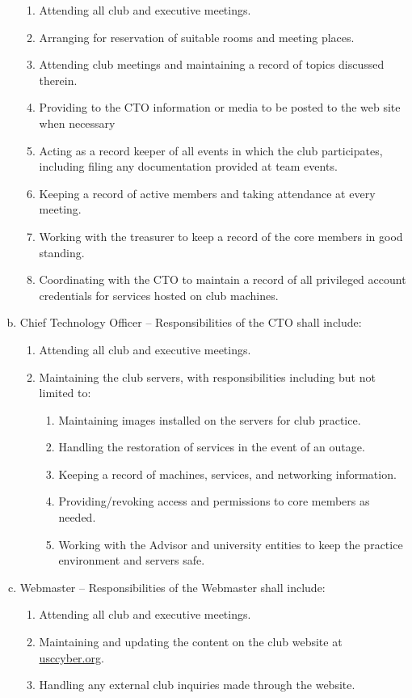 \documentclass[10pt]{article}
\begin{document}
\begin{enumerate}[(a)]
    \begin{enumerate}[1.]
        \item Attending all club and executive meetings.
        \item Arranging for reservation of suitable rooms and meeting places.
        \item Attending club meetings and maintaining a record of topics discussed therein.
        \item Providing to the CTO information or media to be posted to the web site when necessary
        \item Acting as a record keeper of all events in which the club participates, including filing any documentation provided at team events.
        \item Keeping a record of active members and taking attendance at every meeting.
        \item Working with the treasurer to keep a record of the core members in good standing.
        \item Coordinating with the CTO to maintain a record of all privileged account credentials for services hosted on club machines.
    \end{enumerate}
    \item Chief Technology Officer -- Responsibilities of the CTO shall include:
    \begin{enumerate}[1.]
        \item Attending all club and executive meetings.
        \item Maintaining the club servers, with responsibilities including but not limited to:
        \begin{enumerate}
            \item Maintaining images installed on the servers for club practice.
            \item Handling the restoration of services in the event of an outage.
            \item Keeping a record of machines, services, and networking information.
            \item Providing/revoking access and permissions to core members as needed.
            \item Working with the Advisor and university entities to keep the practice environment and servers safe.
        \end{enumerate}
    \end{enumerate}
    \item Webmaster -- Responsibilities of the Webmaster shall include:
    \begin{enumerate}[1.]
        \item Attending all club and executive meetings.
        \item Maintaining and updating the content on the club website at \url{usccyber.org}.
        \item Handling any external club inquiries made through the website.
    \end{enumerate}
\end{enumerate}
\end{document}
